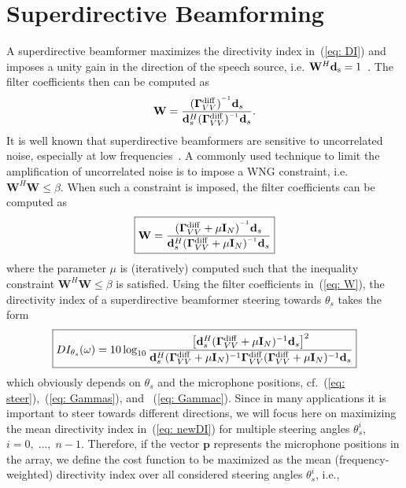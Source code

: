 \documentclass[9pt]{article}
\begin{document}
\section{Superdirective Beamforming}
\vspace{-0.2cm}
A superdirective beamformer maximizes the directivity index in~(\ref{eq: DI}) and imposes a unity gain in the direction of the speech source, i.e. $\mathbf{W}^{H}\mathbf{d}_{\rm s} = 1$~\cite{MAbook2}. The filter coefficients then can be computed as
\begin{equation*}
\mathbf{W} =  \frac{(\mathbf{\Gamma}^{\rm diff}_{VV})^{^{-1}}{\mathbf{d}_{s}}}{\mathbf{d}^{H}_{s}(\mathbf{\Gamma}^{\rm diff}_{VV})^{^{-1}}\mathbf{d}_{s}}.
\end{equation*}
It is well known that superdirective beamformers are sensitive to uncorrelated noise, especially at low frequencies~\cite{MAbook2,doclomoonensd}. A commonly used technique to limit the amplification of uncorrelated noise is to impose a WNG constraint, i.e. $\mathbf{W}^{H}\mathbf{W} \leq \beta$. When such a constraint is imposed, the filter coefficients can be computed as
\begin{equation}
\label{eq: W}
\boxed{\mathbf{W} =  \frac{(\mathbf{\Gamma}^{\rm diff}_{VV} + \mu \mathbf{I}_N)^{^{-1}}{\mathbf{d}_s}}{\mathbf{d}_s^{H}(\mathbf{\Gamma}^{\rm diff}_{VV} + \mu \mathbf{I}_N)^{^{-1}}\mathbf{d}_s}}
\end{equation}
where the parameter $\mu$ is (iteratively) computed such that the inequality constraint $\mathbf{W}^{H}\mathbf{W} \leq \beta$ is satisfied.
Using the filter coefficients in~(\ref{eq: W}), the directivity index of a superdirective beamformer steering towards $\theta_s$ takes the form
\scriptsize
\begin{equation}
\label{eq: newDI}
\boxed{DI_{\theta_s}(\omega) = 10 \log_{10} \frac{ \left[ \mathbf{d}_{s}^{H}(\mathbf{\Gamma}_{VV}^{\rm diff}+\mu \mathbf{I}_{N})^{-1}\mathbf{d}_{s}\right]^2}{\mathbf{d}_s^{H}(\mathbf{\Gamma}_{VV}^{\rm diff}+\mu \mathbf{I}_{N})^{-1} \mathbf{\Gamma}_{VV}^{\rm diff}(\mathbf{\Gamma}_{VV}^{\rm diff}+\mu \mathbf{I}_{N})^{-1} \mathbf{d}_s}}
\end{equation}
\normalsize
which obviously depends on $\theta_s$ and the microphone positions, cf.~(\ref{eq: steer}),~(\ref{eq: Gammas}), and ~(\ref{eq: Gammac}).
Since in many applications it is important to steer towards different directions, we will focus here on maximizing the mean directivity index in~(\ref{eq: newDI}) for multiple steering angles $\theta_{s}^{i}$, $i = 0,\; \ldots,\; n-1$. Therefore, if the vector $\mathbf{p}$ represents the microphone positions in the array, we define the cost function to be maximized as the mean (frequency-weighted) directivity index over all considered steering angles $\theta_{s}^{i}$, i.e.,
\end{document}
